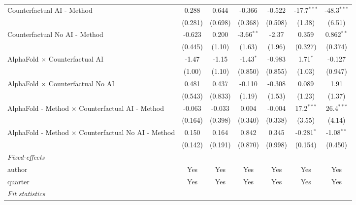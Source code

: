 \begin{tabular}{lcccccc}
   Counterfactual AI - Method                                 & 0.288   & 0.644   & -0.366       & -0.522  & -17.7$^{***}$ & -48.3$^{***}$\\   
                                                              & (0.281) & (0.698) & (0.368)      & (0.508) & (1.38)        & (6.51)\\   
   Counterfactual No AI - Method                              & -0.623  & 0.200   & -3.66$^{**}$ & -2.37   & 0.359         & 0.862$^{**}$\\   
                                                              & (0.445) & (1.10)  & (1.63)       & (1.96)  & (0.327)       & (0.374)\\   
   AlphaFold $\times$ Counterfactual AI                       & -1.47   & -1.15   & -1.43$^{*}$  & -0.983  & 1.71$^{*}$    & -0.127\\   
                                                              & (1.00)  & (1.10)  & (0.850)      & (0.855) & (1.03)        & (0.947)\\   
   AlphaFold $\times$ Counterfactual No AI                    & 0.481   & 0.437   & -0.110       & -0.308  & 0.089         & 1.91\\   
                                                              & (0.543) & (0.833) & (1.19)       & (1.53)  & (1.23)        & (1.37)\\   
   AlphaFold - Method $\times$ Counterfactual AI - Method     & -0.063  & -0.033  & 0.004        & -0.004  & 17.2$^{***}$  & 26.4$^{***}$\\   
                                                              & (0.164) & (0.398) & (0.340)      & (0.338) & (3.55)        & (4.14)\\   
   AlphaFold - Method $\times$ Counterfactual No AI - Method  & 0.150   & 0.164   & 0.842        & 0.345   & -0.281$^{*}$  & -1.08$^{**}$\\   
                                                              & (0.142) & (0.191) & (0.870)      & (0.998) & (0.154)       & (0.450)\\   
   \midrule
   \emph{Fixed-effects}\\
   author                                                     & Yes     & Yes     & Yes          & Yes     & Yes           & Yes\\  
   quarter                                                    & Yes     & Yes     & Yes          & Yes     & Yes           & Yes\\  
   \midrule
   \emph{Fit statistics}\\

\end{tabular}
